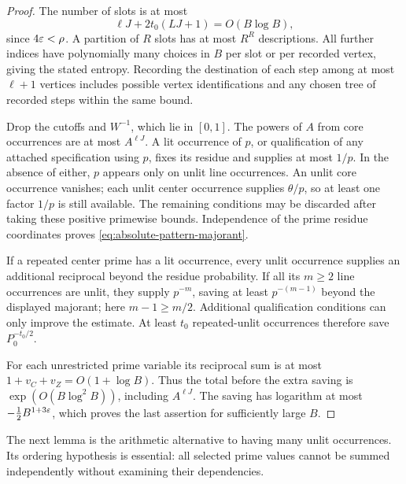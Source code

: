 \begin{proof}
The number of slots is at most
\[
 \ell J+2t_0(LJ+1)=O(B\log B),
\]
since $4\varepsilon<\rho$.  A partition of $R$ slots has at most $R^R$
descriptions.  All further indices have polynomially many choices
in $B$ per slot or per recorded vertex, giving the stated entropy.
Recording the destination of each step among at most $\ell+1$
vertices includes possible vertex identifications and any chosen
tree of recorded steps within the same bound.

Drop the cutoffs and $W^{-1}$, which lie in $[0,1]$.  The powers of
$A$ from core occurrences are at most $A^{\ell J}$.  A lit occurrence
of $p$, or qualification of any attached specification using $p$, fixes its
residue and supplies at most $1/p$.  In the absence of either, $p$
appears only on unlit line occurrences.  An unlit core occurrence
vanishes; each unlit center occurrence supplies $\theta/p$, so at
least one factor $1/p$ is still available.  The remaining conditions
may be discarded after taking these positive primewise bounds.
Independence of the prime residue coordinates proves
\eqref{eq:absolute-pattern-majorant}.

If a repeated center prime has a lit occurrence, every unlit
occurrence supplies an additional reciprocal beyond the residue
probability.  If all its $m\ge2$ line occurrences are unlit, they
supply $p^{-m}$, saving at least $p^{-(m-1)}$ beyond the displayed
majorant; here $m-1\ge m/2$.  Additional qualification conditions can
only improve the estimate.  At least $t_0$ repeated-unlit occurrences
therefore save $P_0^{-t_0/2}$.

For each unrestricted prime variable its reciprocal sum is at most
$1+v_C+v_Z=O(1+\log B)$.  Thus the total before the extra saving is
$\exp(O(B\log^2B))$, including $A^{\ell J}$.  The saving has
logarithm at most $-\frac12 B^{1+3\varepsilon}$, which proves the last
assertion for sufficiently large $B$.
\end{proof}

The next lemma is the arithmetic alternative to having many unlit
occurrences.  Its ordering hypothesis is essential: all selected
prime values cannot be summed independently without examining their
dependencies.


